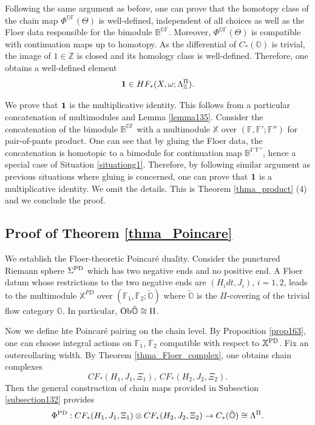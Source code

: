 \documentclass[reqno, 10pt]{amsart}
\numberwithin{equation}{section}
\numberwithin{equation}{section}
\theoremstyle{definition}
\theoremstyle{remark}
\newcommand{\beqn}{\begin{equation*}}
\newcommand{\eeqn}{\end{equation*}}
\newcommand{\mb}{\mathbb}
\begin{document}
Following the same argument as before, one can prove that the homotopy class of the chain map $\Phi^{\mb{OF}}(\Theta)$ is well-defined, independent of all choices as well as the Floer data responsible for the bimodule ${\mb B}^{\mb{OF}}$. Moreover, $\Phi^{\mb{OF}}(\Theta)$ is compatible with continuation maps up to homotopy. As the differential of $C_*(\mb{O})$ is trivial, the image of $1 \in {\mb Z}$ is closed and its homology class is well-defined. Therefore, one obtains a well-defined element 
\beqn
{\bf 1} \in HF_*(X, \omega; \Lambda_{\mb Z}^\Pi).
\eeqn

We prove that ${\bf 1}$ is the multiplicative identity. This follows from a particular concatenation of multimodules and Lemma \ref{lemma135}. Consider the concatenation of the bimodule $\mb{B}^{\mb{OF}}$ with a multimodule ${\mb X}$ over $({\mb F}, {\mb F}'; {\mb F}'')$ for pair-of-pants product. One can see that by gluing the Floer data, the concatenation is homotopic to a bimodule for continuation map $\mb{B}^{\mb{F}'\mb{F}''}$, hence a special case of Situation \ref{situationg1}. Therefore, by following similar argument as previous situations where gluing is concerned, one can prove that ${\bf 1}$ is a multiplicative identity. We omit the details. This is Theorem \ref{thma_product} (4) and we conclude the proof.



\subsection{Proof of Theorem \ref{thma_Poincare}}\label{subsection_PD}

We establish the Floer-theoretic Poincar\'e duality. Consider the punctured Riemann sphere $\Sigma^{\rm PD}$ which has two negative ends and no positive end. A Floer datum whose restrictions to the two negative ends are $(H_idt, J_i)$, $i = 1, 2$, leads to the multimodule ${\mb X}^{PD}$ over $({\mb F}_1, {\mb F}_2; \tilde {\mb O})$  where $\tilde {\mb O}$ is the $\Pi$-covering of the trivial flow category ${\mb O}$. In particular, ${\rm Ob}\tilde {\mb O} \cong \Pi$. 

Now we define hte Poincar\'e pairing on the chain level. By Proposition \ref{prop163}, one can choose integral actions on ${\mb F}_1$, ${\mb F}_2$ compatible with respect to ${\mb X}^{\rm PD}$. Fix an outercollaring width. By Theorem \ref{thma_Floer_complex}, one obtains chain complexes 
\beqn
CF_*(H_1, J_1, \Xi_1),\ CF_*(H_2, J_2, \Xi_2).
\eeqn
Then the general construction of chain maps provided in Subsection \ref{subsection132} provides 
\beqn
\Phi^{\rm PD}: CF_*(H_1, J_1, \Xi_1) \otimes CF_*(H_2, J_2, \Xi_2) \to C_*(\tilde {\mb O}) \cong \Lambda^\Pi.
\eeqn
\end{document}
